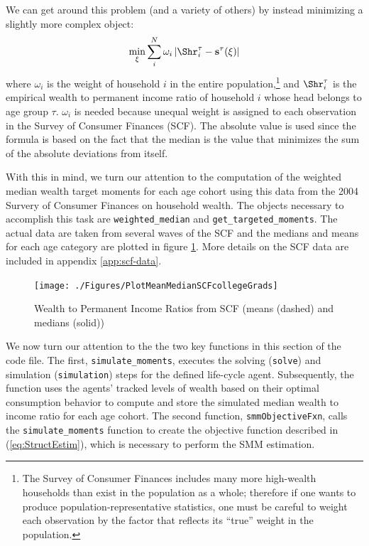 \documentclass[titlepage, headings=optiontotocandhead]{econtex}
\begin{document}
We can get around this problem (and a variety of others) by instead minimizing a slightly more complex object:
  \begin{equation}
    \min_{\xi}\sum_{i}^{N}\omega _{i}\left|\Shr_{i}^{\tau }-\mathbf{s}^{\tau}(\xi )\right|\label{eq:StructEstim}
  \end{equation}
where $\omega_{i}$ is the weight of household $i$ in the entire
population,\footnote{The Survey of Consumer Finances includes many
  more high-wealth households than exist in the population as a whole;
  therefore if one wants to produce population-representative
  statistics, one must be careful to weight each observation by the
  factor that reflects its ``true'' weight in the population.} and
$\Shr_{i}^{\tau }$ is the empirical wealth to permanent income
ratio of household $i$ whose head belongs to age group
$\tau$. $\omega _{i}$ is needed because unequal weight is assigned to
each observation in the Survey of Consumer Finances (SCF). The
absolute value is used since the formula is based on the fact that the
median is the value that minimizes the sum of the absolute deviations
from itself.


With this in mind, we turn our attention to the computation
of the weighted median wealth target moments for each age cohort
using this data from the 2004 Survery of Consumer Finances on household
wealth. The objects necessary to accomplish this task are \texttt{weighted\_median} and
\texttt{get\_targeted\_moments}. The actual data are taken from several waves of the SCF and the medians
and means for each age category are plotted in figure \ref{fig:MeanMedianSCF}.
More details on the SCF data are included in appendix \ref{app:scf-data}.

\hypertarget{PlotMeanMedianSCFcollegeGrads}{}
\begin{figure}
  \texttt{[image: ./Figures/PlotMeanMedianSCFcollegeGrads]}
  \caption{Wealth to Permanent Income Ratios from SCF (means (dashed) and medians (solid))}
  \label{fig:MeanMedianSCF}
\end{figure}

We now turn our attention to the the two key functions in this section of the code file. The first, \texttt{simulate\_moments}, executes the solving (\texttt{solve}) and simulation (\texttt{simulation}) steps for the defined life-cycle agent.  Subsequently, the function uses the agents' tracked levels of wealth based on their optimal consumption behavior to compute and store the simulated median wealth to income ratio for each age cohort. The second function, \texttt{smmObjectiveFxn}, calls the \texttt{simulate\_moments} function to create the objective function described in (\ref{eq:StructEstim}), which is necessary to perform the SMM estimation.
\end{document}
